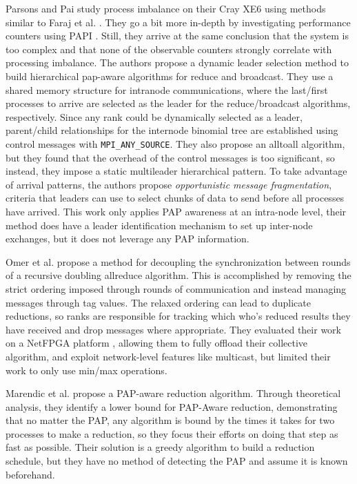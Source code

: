 Parsons and Pai \cite{Parsons2015ExpProcImbMPICollHierarcialSys} study process imbalance on their Cray XE6 using methods similar to Faraj et al. \cite{Faraj2008StudyProcArrivalMPIColl}.
They go a bit more in-depth by investigating performance counters using PAPI \cite{Mucci1999PAPI}. 
Still, they arrive at the same conclusion that the system is too complex and that none of the observable counters strongly correlate with processing imbalance. 
The authors propose a dynamic leader selection method to build hierarchical pap-aware algorithms for reduce and broadcast.
They use a shared memory structure for intranode communications, where the last/first processes to arrive are selected as the leader for the reduce/broadcast algorithms, respectively. 
Since any rank could be dynamically selected as a leader, parent/child relationships for the internode binomial tree are established using control messages with \texttt{MPI\_ANY\_SOURCE}. 
They also propose an alltoall algorithm, but they found that the overhead of the control messages is too significant, so instead, they impose a static multileader hierarchical pattern.
To take advantage of arrival patterns, the authors propose \textit{opportunistic message fragmentation}, criteria that leaders can use to select chunks of data to send before all processes have arrived.
This work only applies PAP awareness at an intra-node level, their method does have a leader identification mechanism to set up inter-node exchanges, but it does not leverage any PAP information.

Omer et al. \cite{Arap2015AdaptiveRDForCC} propose a method for decoupling the synchronization between rounds of a recursive doubling allreduce algorithm. 
This is accomplished by removing the strict ordering imposed through rounds of communication and instead managing messages through tag values.
The relaxed ordering can lead to duplicate reductions, so ranks are responsible for tracking which who's reduced results they have received and drop messages where appropriate. 
They evaluated their work on a NetFPGA platform \cite{Lockwood2007NetFPGA}, allowing them to fully offload their collective algorithm, and exploit network-level features like multicast, but limited their work to only use min/max operations.

Marendic et al. \cite{Marendic2016Clairvoyant} propose a PAP-aware reduction algorithm.
Through theoretical analysis, they identify a lower bound for PAP-Aware reduction, demonstrating that no matter the PAP, any algorithm is bound by the times it takes for two processes to make a reduction, so they focus their efforts on doing that step as fast as possible. 
Their solution is a greedy algorithm to build a reduction schedule, but they have no method of detecting the PAP and assume it is known beforehand.

